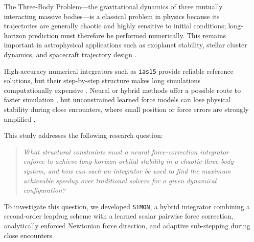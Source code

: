 \documentclass[12pt]{article}
\begin{document}
The Three-Body Problem---the gravitational dynamics of three mutually
interacting massive bodies---is a classical problem in physics because
its trajectories are generally chaotic and highly sensitive to initial
conditions; long-horizon prediction must therefore be performed
numerically. This remains important in astrophysical applications such
as exoplanet stability, stellar cluster dynamics, and spacecraft
trajectory design \cite{gardner2006james}.

High-accuracy numerical integrators such as \texttt{ias15} provide
reliable reference solutions, but their step-by-step structure makes
long simulations computationally expensive \cite{Rein_2014}. Neural or
hybrid methods offer a possible route to faster simulation
\cite{ulibarrena2024hybrid}, but unconstrained learned force models can
lose physical stability during close encounters, where small position or
force errors are strongly amplified \cite{Dehnen2001}.

This study addresses the following research question:
\begin{quote}
\emph{What structural constraints must a neural force-correction
integrator enforce to achieve long-horizon orbital stability in a
chaotic three-body system, and how can such an integrator be used to
find the maximum achievable speedup over traditional solvers for a given
dynamical configuration?}
\end{quote}

To investigate this question, we developed \texttt{SIMON}, a hybrid
integrator combining a second-order leapfrog scheme with a learned
scalar pairwise force correction, analytically enforced Newtonian force
direction, and adaptive sub-stepping during close encounters.
\end{document}
